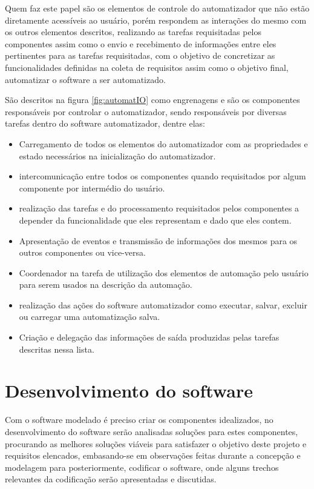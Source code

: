 \documentclass[tg]{mdtufsm}
\begin{document}
                    Quem faz este papel são os elementos de controle do automatizador que não estão diretamente acessíveis ao usuário, porém respondem as interações do mesmo com os outros elementos descritos, realizando as tarefas requisitadas pelos componentes assim como o envio e recebimento de informações entre eles pertinentes para as tarefas requisitadas, com o objetivo de concretizar as funcionalidades definidas na coleta de requisitos assim como o objetivo final, automatizar o software a ser automatizado.

                    São descritos na figura \ref{fig:automatIO} como engrenagens e são os componentes responsáveis por controlar o automatizador, sendo responsáveis por diversas tarefas dentro do software automatizador, dentre elas:

                    \begin{itemize}
                        \item Carregamento de todos os elementos do automatizador com as propriedades e estado necessários na inicialização do automatizador.
                        \item intercomunicação entre todos os componentes quando requisitados por algum componente por intermédio do usuário.
                        \item realização das tarefas e do processamento requisitados pelos componentes a depender da funcionalidade que eles representam e dado que eles contem.
                        \item Apresentação de eventos e transmissão de informações dos mesmos para os outros componentes ou vice-versa.
                        \item Coordenador na tarefa de utilização dos elementos de automação pelo usuário para serem usados na descrição da automação.
                        \item realização das ações do software automatizador como executar, salvar, excluir ou carregar uma automatização salva.
                        \item Criação e delegação das informações de saída produzidas pelas tarefas descritas nessa lista.
                    \end{itemize}

        \section {Desenvolvimento do software}

            Com o software modelado é preciso criar os componentes idealizados, no desenvolvimento do software serão analisadas soluções para estes componentes, procurando as melhores soluções viáveis para satisfazer o objetivo deste projeto e requisitos elencados, embasando-se em observações feitas durante a concepção e modelagem para posteriormente, codificar o software, onde alguns trechos relevantes da codificação serão apresentadas e discutidas.
\end{document}
